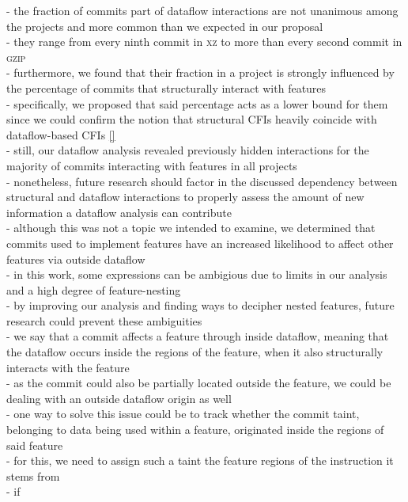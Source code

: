 - the fraction of commits part of dataflow interactions are not unanimous among the projects and more common than we expected in our proposal \\
- they range from every ninth commit in \textsc{xz} to more than every second commit in \textsc{gzip} \\
- furthermore, we found that their fraction in a project is strongly influenced by the percentage of commits that structurally interact with features \\
- specifically, we proposed that said percentage acts as a lower bound for them since we could confirm the notion that structural CFIs heavily coincide with dataflow-based CFIs \ref{} \\
- still, our dataflow analysis revealed previously hidden interactions for the majority of commits interacting with features in all projects \\
- nonetheless, future research should factor in the discussed dependency between structural and dataflow interactions to properly assess the amount of new information a dataflow analysis can contribute \\
- although this was not a topic we intended to examine, we determined that commits used to implement features have an increased likelihood to affect other features via outside dataflow \\













\iffalse 
- in this work, some expressions can be ambigious due to limits in our analysis and a high degree of feature-nesting \\
- by improving our analysis and finding ways to decipher nested features, future research could prevent these ambiguities \\
- we say that a commit affects a feature through inside dataflow, meaning that the dataflow occurs inside the regions of the feature, when it also structurally interacts with the feature \\
- as the commit could also be partially located outside the feature, we could be dealing with an outside dataflow origin as well \\
- one way to solve this issue could be to track whether the commit taint, belonging to data being used within a feature, originated inside the regions of said feature \\
- for this, we need to assign such a taint the feature regions of the instruction it stems from \\
- if 

